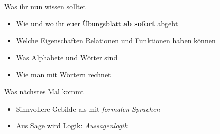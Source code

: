 \begin{frame}	
	\begin{block}{Was ihr nun wissen solltet}
		\begin{itemize}
			\item Wie und wo ihr euer Übungsblatt \textbf{ab sofort} abgebt
			\item Welche Eigenschaften Relationen und Funktionen haben können
			\item Was Alphabete und Wörter sind
			\item Wie man mit Wörtern rechnet
		\end{itemize}
	\end{block}
	
	\begin{block}{Was nächstes Mal kommt}
		\begin{itemize}
			\item Sinnvollere Gebilde als  mit \emph{formalen Sprachen}
			\item Aus Sage wird Logik: \emph{Aussagenlogik}
		\end{itemize}
	\end{block}
\end{frame}

\slideThanks

